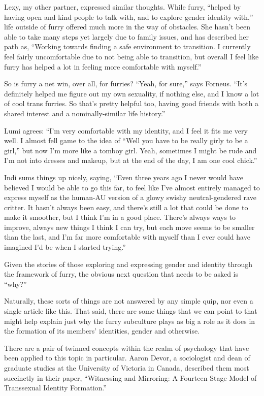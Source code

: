 Lexy, my other partner, expressed similar thoughts. While furry, ``helped by having open and kind people to talk with, and to explore gender identity with,'' life outside of furry offered much more in the way of obstacles. She hasn't been able to take many steps yet largely due to family issues, and has described her path as, ``Working towards finding a safe environment to transition. I currently feel fairly uncomfortable due to not being able to transition, but overall I feel like furry has helped a lot in feeling more comfortable with myself.''

So is furry a net win, over all, for furries? ``Yeah, for sure,'' says Forneus. ``It's definitely helped me figure out my own sexuality, if nothing else, and I know a lot of cool trans furries. So that's pretty helpful too, having good friends with both a shared interest and a nominally-similar life history.''

Lumi agrees: ``I'm very comfortable with my identity, and I feel it fits me very well. I almost fell game to the idea of ``Well you have to be really girly to be a girl,'' but now I'm more like a tomboy girl. Yeah, sometimes I might be rude and I'm not into dresses and makeup, but at the end of the day, I am one cool chick.''

Indi sums things up nicely, saying, ``Even three years ago I never would have believed I would be able to go this far, to feel like I've almost entirely managed to express myself as the human-AU version of a glowy swishy neutral-gendered rave critter. It hasn't always been easy, and there's still a lot that could be done to make it smoother, but I think I'm in a good place. There's always ways to improve, always new things I think I can try, but each move seems to be smaller than the last, and I'm far more comfortable with myself than I ever could have imagined I'd be when I started trying.''

Given the stories of those exploring and expressing gender and identity through the framework of furry, the obvious next question that needs to be asked is ``why?''

Naturally, these sorts of things are not answered by any simple quip, nor even a single article like this. That said, there are some things that we can point to that might help explain just why the furry subculture plays as big a role as it does in the formation of its members' identities, gender and otherwise.

There are a pair of twinned concepts within the realm of psychology that have been applied to this topic in particular. Aaron Devor, a sociologist and dean of graduate studies at the University of Victoria in Canada, described them most succinctly in their paper, ``Witnessing and Mirroring: A Fourteen Stage Model of Transsexual Identity Formation.''

